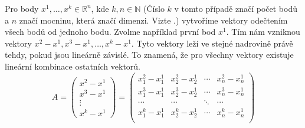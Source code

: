 Pro body $x^1, \ldots, x^k \in \mathbb{R}^n$, kde  $k, n \in \mathbb{N}$ (Číslo $k$ v tomto případě značí počet bodů a $n$ značí mocninu, která značí dimenzi. Vizte .) vytvoříme vektory odečtením všech bodů od jednoho bodu. Zvolme například první bod $x^1$. Tím nám vzniknou vektory $x^2-x^1, x^3-x^1, \dots, x^k-x^1$. Tyto vektory leží ve stejné nadrovině právě tehdy, pokud jsou lineárně závislé. To znamená, že pro všechny vektory existuje lineární kombinace ostatních vektorů. 
\begingroup
\renewcommand*{\arraystretch}{1.25}
\begin{equation*}
  A =
  \begin{pmatrix}
    x^2-x^1 \\
    x^3-x^1 \\
    \vdots  \\
    x^k-x^1
  \end{pmatrix}
  =
  \begin{pmatrix}
    x^2_1 - x^1_1 & x^2_2 - x^1_2 & \cdots & x^2_n - x^1_n \\
    x^3_1 - x^1_1 & x^3_2 - x^1_2 & \cdots & x^3_n - x^1_n \\
    \cdots        & \cdots        & \ddots & \cdots        \\
    x^k_1 - x^1_1 & x^k_2 - x^1_2 & \cdots & x^k_n - x^1_n \\
  \end{pmatrix}
\end{equation*}
\endgroup



